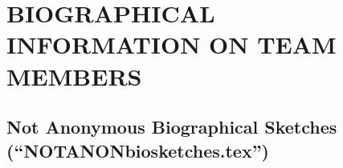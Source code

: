 \documentclass[usenames,dvipsnames,modern]{CLASS_FILES/aastex631}
\begin{document}
\newpage
{\mbox{} \vfill \section{BIOGRAPHICAL INFORMATION ON TEAM MEMBERS} \vfill \mbox{}}

\newpage
\subsection{\textbf{Not} Anonymous Biographical Sketches (``NOTANONbiosketches.tex'')}
\def\myNameBoldface#1{\textbf{#1}} %
\def\myNameColor{Blue} %
\def\myNameSize{\large } %
\def\myLabelBoldface#1{\textbf{#1}} %
\def\mySectionSpacing{\par \vspace{-0.5em}} %
\def\myPublicationBullet{{\scriptsize{$\bullet$}} } %


\newpage
\end{document}
